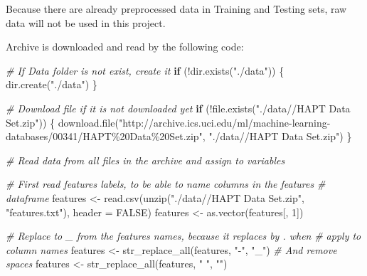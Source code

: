 \documentclass[
]{article}
\newenvironment{Shaded}{\begin{snugshade}}{\end{snugshade}}
\newcommand{\AttributeTok}[1]{\textcolor[rgb]{0.77,0.63,0.00}{#1}}
\newcommand{\CommentTok}[1]{\textcolor[rgb]{0.56,0.35,0.01}{\textit{#1}}}
\newcommand{\ConstantTok}[1]{\textcolor[rgb]{0.00,0.00,0.00}{#1}}
\newcommand{\ControlFlowTok}[1]{\textcolor[rgb]{0.13,0.29,0.53}{\textbf{#1}}}
\newcommand{\DecValTok}[1]{\textcolor[rgb]{0.00,0.00,0.81}{#1}}
\newcommand{\FunctionTok}[1]{\textcolor[rgb]{0.00,0.00,0.00}{#1}}
\newcommand{\NormalTok}[1]{#1}
\newcommand{\OtherTok}[1]{\textcolor[rgb]{0.56,0.35,0.01}{#1}}
\newcommand{\SpecialCharTok}[1]{\textcolor[rgb]{0.00,0.00,0.00}{#1}}
\newcommand{\StringTok}[1]{\textcolor[rgb]{0.31,0.60,0.02}{#1}}
\begin{document}
Because there are already preprocessed data in Training and Testing
sets, raw data will not be used in this project.

Archive is downloaded and read by the following code:

\begin{Shaded}
\begin{Highlighting}[]
\CommentTok{\# If \textquotesingle{}Data\textquotesingle{} folder is not exist, create it}
\ControlFlowTok{if}\NormalTok{ (}\SpecialCharTok{!}\FunctionTok{dir.exists}\NormalTok{(}\StringTok{"./data"}\NormalTok{)) \{}
    \FunctionTok{dir.create}\NormalTok{(}\StringTok{"./data"}\NormalTok{)}
\NormalTok{\}}

\CommentTok{\# Download file if it is not downloaded yet}
\ControlFlowTok{if}\NormalTok{ (}\SpecialCharTok{!}\FunctionTok{file.exists}\NormalTok{(}\StringTok{"./data//HAPT Data Set.zip"}\NormalTok{)) \{}
    \FunctionTok{download.file}\NormalTok{(}\StringTok{"http://archive.ics.uci.edu/ml/machine{-}learning{-}databases/00341/HAPT\%20Data\%20Set.zip"}\NormalTok{,}
        \StringTok{"./data//HAPT Data Set.zip"}\NormalTok{)}
\NormalTok{\}}

\CommentTok{\# Read data from all files in the archive and assign to variables}

\CommentTok{\# First read features labels, to be able to name columns in the features}
\CommentTok{\# dataframe}
\NormalTok{features }\OtherTok{\textless{}{-}} \FunctionTok{read.csv}\NormalTok{(}\FunctionTok{unzip}\NormalTok{(}\StringTok{"./data//HAPT Data Set.zip"}\NormalTok{, }\StringTok{"features.txt"}\NormalTok{), }\AttributeTok{header =} \ConstantTok{FALSE}\NormalTok{)}
\NormalTok{features }\OtherTok{\textless{}{-}} \FunctionTok{as.vector}\NormalTok{(features[, }\DecValTok{1}\NormalTok{])}

\CommentTok{\# Replace \textquotesingle{}{-}\textquotesingle{} to \textquotesingle{}\_\textquotesingle{} from the features names, because it replaces by \textquotesingle{}.\textquotesingle{} when}
\CommentTok{\# apply to column names}
\NormalTok{features }\OtherTok{\textless{}{-}} \FunctionTok{str\_replace\_all}\NormalTok{(features, }\StringTok{"{-}"}\NormalTok{, }\StringTok{"\_"}\NormalTok{)}
\CommentTok{\# And remove spaces}
\NormalTok{features }\OtherTok{\textless{}{-}} \FunctionTok{str\_replace\_all}\NormalTok{(features, }\StringTok{" "}\NormalTok{, }\StringTok{""}\NormalTok{)}


\end{Highlighting}
\end{Shaded}
\end{document}
